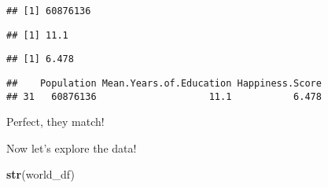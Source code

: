 \documentclass[]{article}
\newenvironment{Shaded}{\begin{snugshade}}{\end{snugshade}}
\newcommand{\KeywordTok}[1]{\textcolor[rgb]{0.13,0.29,0.53}{\textbf{#1}}}
\newcommand{\NormalTok}[1]{#1}
\newcommand{\OperatorTok}[1]{\textcolor[rgb]{0.81,0.36,0.00}{\textbf{#1}}}
\newcommand{\StringTok}[1]{\textcolor[rgb]{0.31,0.60,0.02}{#1}}
\begin{document}
\begin{verbatim}
## [1] 60876136
\end{verbatim}

\begin{Shaded}
\end{Shaded}

\begin{verbatim}
## [1] 11.1
\end{verbatim}

\begin{Shaded}
\end{Shaded}

\begin{verbatim}
## [1] 6.478
\end{verbatim}

\begin{Shaded}
\end{Shaded}

\begin{verbatim}
##    Population Mean.Years.of.Education Happiness.Score
## 31   60876136                    11.1           6.478
\end{verbatim}

Perfect, they match!

Now let's explore the data!

\begin{Shaded}
\begin{Highlighting}[]
\KeywordTok{str}\NormalTok{(world_df)}
\end{Highlighting}
\end{Shaded}
\end{document}
